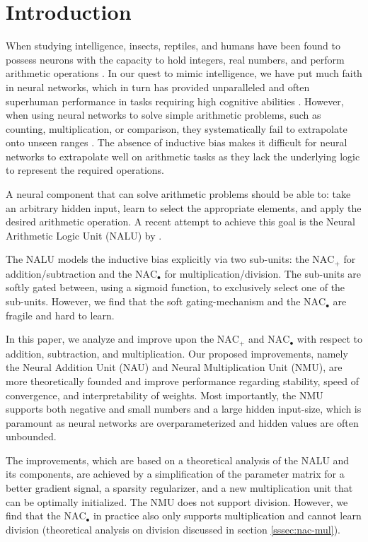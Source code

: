 \section{Introduction}
When studying intelligence, insects, reptiles, and humans have been found to possess neurons with the capacity to hold integers, real numbers, and perform arithmetic operations \cite{nieder-neuronal-number,rugani-arithmetic-chicks,gallistel-numbers-in-brain}.
In our quest to mimic intelligence, we have put much faith in neural networks, which in turn has provided unparalleled and often superhuman performance in tasks requiring high cognitive abilities \cite{natureGo,bert,openai-learning-dexterous}.
However, when using neural networks to solve simple arithmetic problems, such as counting, multiplication, or comparison, they systematically fail to extrapolate onto unseen ranges \cite{stillNotSystematic,suzgun2019evaluating,trask-nalu}.
The absence of inductive bias makes it difficult for neural networks to extrapolate well on arithmetic tasks as they lack the underlying logic to represent the required operations.

A neural component that can solve arithmetic problems should be able to: take an arbitrary hidden input, learn to select the appropriate elements, and apply the desired arithmetic operation.
A recent attempt to achieve this goal is the Neural Arithmetic Logic Unit (NALU) by \citet{trask-nalu}.

The NALU models the inductive bias explicitly via two sub-units: the $\text{NAC}_{+}$ for addition/subtraction and the $\text{NAC}_{\bullet}$ for multiplication/division.
The sub-units are softly gated between, using a sigmoid function, to exclusively select one of the sub-units.
However, we find that the soft gating-mechanism and the $\text{NAC}_{\bullet}$ are fragile and hard to learn.

In this paper, we analyze and improve upon the $\text{NAC}_{+}$ and $\text{NAC}_{\bullet}$ with respect to addition, subtraction, and multiplication.
Our proposed improvements, namely the Neural Addition Unit (NAU) and Neural Multiplication Unit (NMU), are more theoretically founded and improve performance regarding stability, speed of convergence, and interpretability of weights.
Most importantly, the NMU supports both negative and small numbers and a large hidden input-size, which is paramount as neural networks are overparameterized and hidden values are often unbounded.

The improvements, which are based on a theoretical analysis of the NALU and its components, are achieved by a simplification of the parameter matrix for a better gradient signal, a sparsity regularizer, and a new multiplication unit that can be optimally initialized.
The NMU does not support division.
However, we find that the $\text{NAC}_{\bullet}$ in practice also only supports multiplication and cannot learn division (theoretical analysis on division discussed in section \ref{sssec:nac-mul}).

